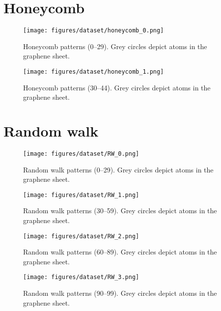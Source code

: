 \section{Honeycomb}
\begin{figure}[H]
    \centering
    \texttt{[image: figures/dataset/honeycomb\_0.png]}
    \caption{Honeycomb patterns (0--29). Grey circles depict atoms in the graphene sheet.}
    \label{fig:H0}
\end{figure}
\begin{figure}[H]
    \centering
    \texttt{[image: figures/dataset/honeycomb\_1.png]}
    \caption{Honeycomb patterns (30--44). Grey circles depict atoms in the graphene sheet.}
    \label{fig:H1}
\end{figure}

\section{Random walk}
\begin{figure}[H]
    \centering
    \texttt{[image: figures/dataset/RW\_0.png]}
    \caption{Random walk patterns (0--29). Grey circles depict atoms in the graphene sheet.}
    \label{fig:R0}
\end{figure}
\begin{figure}[H]
    \centering
    \texttt{[image: figures/dataset/RW\_1.png]}
    \caption{Random walk patterns (30--59). Grey circles depict atoms in the graphene sheet.}
    \label{fig:R1}
\end{figure}
\begin{figure}[H]
    \centering
    \texttt{[image: figures/dataset/RW\_2.png]}
    \caption{Random walk patterns (60--89). Grey circles depict atoms in the graphene sheet.}
    \label{fig:R2}
\end{figure}
\begin{figure}[H]
    \centering
    \texttt{[image: figures/dataset/RW\_3.png]}
    \caption{Random walk patterns (90--99). Grey circles depict atoms in the graphene sheet.}
    \label{fig:R3}
\end{figure}



